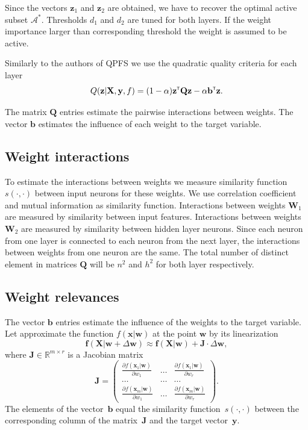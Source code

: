 \documentclass[a4paper,12pt]{article}
\theoremstyle{plain} %
\theoremstyle{definition} %
\theoremstyle{remark} %
\newcommand{\bb}{\mathbf{b}}
\newcommand{\bw}{\mathbf{w}}
\newcommand{\bQ}{\mathbf{Q}}
\newcommand{\bW}{\mathbf{W}}
\newcommand{\by}{\mathbf{y}}
\newcommand{\bx}{\mathbf{x}}
\newcommand{\bz}{\mathbf{z}}
\newcommand{\bX}{\mathbf{X}}
\newcommand{\cA}{\mathcal{A}}
\newcommand{\bbR}{\mathbb{R}}
\newcommand{\T}{{\text{\tiny\sffamily\upshape\mdseries T}}}
\begin{document}
	Since the vectors $\bz_1$ and $\bz_2$ are obtained, we have to recover the optimal active subset $\cA^*$. 
	Thresholds $d_1$ and $d_2$ are tuned for both layers. If the weight importance larger than corresponding threshold the weight is assumed to be active.
	
	Similarly to the authors of QPFS we use the quadratic quality criteria for each layer
	\begin{equation}
		Q(\bz | \bX, \by, f) = (1 - \alpha) \bz^{\T} \bQ\bz - \alpha \mathbf{b}^{\T} \bz.
	\end{equation}
	
	The matrix $\bQ$ entries estimate the pairwise interactions between weights. The vector $\bb$ estimates the influence of each weight to the target variable.
	
	\subsection*{Weight interactions}
	To estimate the interactions between weights we measure similarity function $s(\cdot, \cdot)$ between input neurons for these weights. 
	We use correlation coefficient and mutual information as similarity function.
	Interactions between weights $\bW_1$ are measured by similarity between input features. 
	Interactions between weights $\bW_2$ are measured by similarity between hidden layer neurons.
	Since each neuron from one layer is connected to each neuron from the next layer, the interactions between weights from one neuron are the same.
	The total number of distinct element in matrices $\bQ$ will be $n^2$ and $h^2$ for both layer respectively.
	
	\subsection*{Weight relevances}
	
	The vector $\bb$ entries estimate the influence of the weights to the target variable. Let approximate the function $f(\bx | \bw)$ at the point $\bw$ by its linearization
	\begin{equation}
		\mathbf{f} (\bX | \bw + \Delta \bw) \approx \mathbf{f}(\bX | \bw) + \mathbf{J} \cdot \Delta \bw,
	\end{equation}
	where $\mathbf{J} \in \bbR^{m \times r}$ is a Jacobian matrix
	\begin{equation}
		\mathbf{J} = 
		\begin{pmatrix}
			\frac{\partial f(\bx_1 | \bw)}{\partial w_1} & \dots & 
			\frac{\partial f(\bx_1 | \bw)}{\partial w_r} \\
			\dots & \dots & \dots \\
			\frac{\partial f(\bx_m | \bw)}{\partial w_1} & \dots & 
			\frac{\partial f(\bx_m | \bw)}{\partial w_r}
		\end{pmatrix}.
	\end{equation}
	The elements of the vector~$\bb$ equal the similarity function~$s(\cdot, \cdot)$ between the corresponding column of the matrix~$\mathbf{J}$ and the target vector~$\by$.
	
\end{document}
